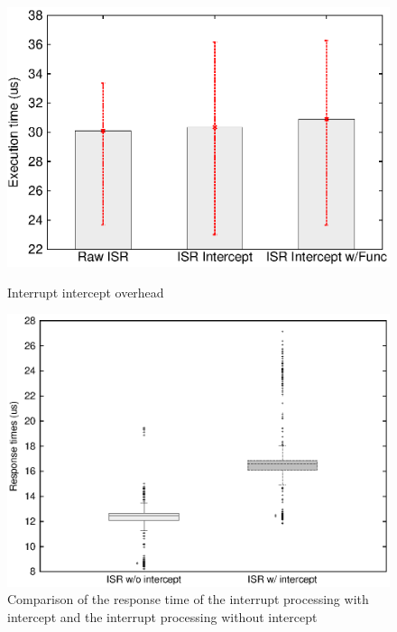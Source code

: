 \begin{figure}[!t]
\begin{minipage}{0.33\hsize}
\begin{center}
\includegraphics[width=\hsize]{img/interrupt.pdf}
\caption{\scriptsize{Interrupt intercept overhead}}
\label{fig:irq_overhead}
\end{center}
\end{minipage}
\begin{minipage}{0.33\hsize}
\begin{center}
\includegraphics[width=\hsize]{img/interrupt_response}
\caption{\scriptsize{Comparison of the response time of the interrupt processing with intercept and the interrupt processing without intercept}}
\label{fig:bottomvstasklet}
\end{center}
\end{minipage}

\end{figure}
